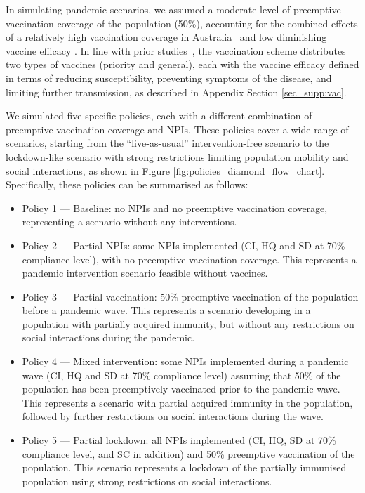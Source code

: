 \documentclass{article}
\begin{document}
In simulating pandemic scenarios, we assumed a moderate level of preemptive vaccination coverage  of the population (50\%), accounting for the combined effects of a relatively high vaccination coverage in Australia~\cite{vac_coverage} and low diminishing vaccine efficacy \cite{vac_eff_diminishing}. In line with prior studies~\cite{chang_simulating_2022,chang_persistence_2023,zachreson_how_2021}, the vaccination scheme distributes two types of vaccines (priority and general), each with the vaccine efficacy defined in terms of reducing susceptibility, preventing symptoms of the disease, and limiting further transmission, as described in Appendix Section \ref{sec_supp:vac}.

We simulated five specific policies, each with a different combination of preemptive vaccination coverage and NPIs. These policies cover a wide range of scenarios, starting from the ``live-as-usual'' intervention-free scenario to the lockdown-like scenario with strong restrictions limiting population mobility and social interactions, as shown in Figure \ref{fig:policies_diamond_flow_chart}. Specifically, these policies can be summarised as follows:
\begin{itemize}
    \item Policy 1 --- Baseline: no NPIs and no preemptive vaccination coverage, representing a scenario without any interventions.
    \item Policy 2 --- Partial NPIs: some NPIs implemented (CI, HQ and SD at 70\% compliance level), with no preemptive vaccination coverage. This represents a pandemic intervention scenario feasible without vaccines.
    \item Policy 3 --- Partial vaccination: 50\% preemptive vaccination of the population before a pandemic wave. This represents a scenario developing in a population with partially acquired immunity,  but without any restrictions on social interactions during the pandemic.
    \item Policy 4 --- Mixed intervention: some NPIs implemented during a pandemic wave (CI, HQ and SD at 70\% compliance level) assuming that 50\% of the population has been preemptively vaccinated prior to the pandemic wave. This represents a scenario with partial acquired immunity in the population, followed by further restrictions on social interactions during the wave.
    \item Policy 5 --- Partial lockdown: all NPIs implemented (CI, HQ, SD at 70\% compliance level, and SC in addition) and 50\% preemptive vaccination of the population. This scenario represents a lockdown of the partially immunised population using strong restrictions on social interactions. 
\end{itemize}
\end{document}
